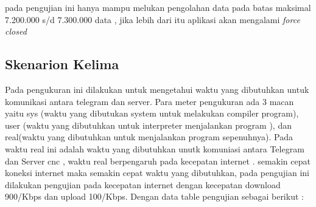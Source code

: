 pada pengujian ini hanya mampu melukan pengolahan data pada batas maksimal 7.200.000 s/d 7.300.000 data , jika lebih dari itu aplikasi akan mengalami \emph{force closed}


\newpage
\subsection{Skenarion Kelima}

Pada pengukuran ini dilakukan untuk mengetahui waktu yang dibutuhkan untuk komunikasi antara telegram dan server. Para meter pengukuran ada 3 macan yaitu
sys (waktu yang dibutukan system untuk melakukan compiler program), user (waktu yang dibutuhkan untuk interpreter menjalankan program ), dan real(waktu yang
dibutuhkan untuk menjalankan program sepenuhnya). Pada waktu real ini adalah
waktu yang dibutuhkan unutk komuniasi antara Telegram dan Server cnc , waktu real
berpengaruh pada kecepatan internet . semakin cepat koneksi internet maka semakin
cepat waktu yang dibutuhkan, pada pengujian ini dilakukan pengujian pada kecepatan
internet dengan kecepatan download 900/Kbps dan upload 100/Kbps. Dengan data
table pengujian sebagai berikut :

